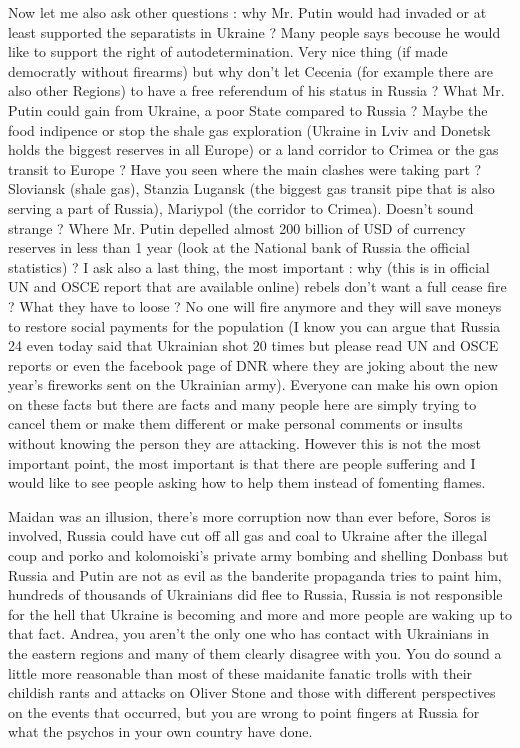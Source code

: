 \begin{itemize}
\begin{itemize}
Now let me also ask other questions : why Mr. Putin would had
invaded or at least supported the separatists in Ukraine ? Many people says
becouse he would like to support the right of autodetermination. Very nice
thing (if made democratly without firearms) but why don't let Cecenia (for
example there are also other Regions) to have a free referendum of his status
in Russia ? What Mr. Putin could gain from Ukraine, a poor State compared to
Russia ? Maybe the food indipence or stop the shale gas exploration (Ukraine in
Lviv and Donetsk holds the biggest reserves in all Europe) or a land corridor
to Crimea or the gas transit to Europe ? Have you seen where the main clashes
were taking part ? Sloviansk (shale gas), Stanzia Lugansk (the biggest gas
transit pipe that is also serving a part of Russia), Mariypol (the corridor to
Crimea). Doesn't sound strange ? Where Mr. Putin depelled almost 200 billion of
USD of currency reserves in less than 1 year (look at the National bank of
Russia the official statistics) ? I ask also a last thing, the most important :
why (this is in official UN and OSCE report that are available online) rebels
don't want a full cease fire ? What they have to loose ? No one will fire
anymore and they will save moneys to restore social payments for the population
(I know you can argue that Russia 24 even today said that Ukrainian shot 20
times but please read UN and OSCE reports or even the facebook page of DNR
where they are joking about the new year's fireworks sent on the Ukrainian
army). Everyone can make his own opion on these facts but there are facts and
many people here are simply trying to cancel them or make them different or
make personal comments or insults without knowing the person they are
attacking. However this is not the most important point, the most important is
that there are people suffering and I would like to see people asking how to
help them instead of fomenting flames.


Maidan was an illusion, there's more corruption now than ever before, Soros is
involved, Russia could have cut off all gas and coal to Ukraine after the
illegal coup and porko and kolomoiski's private army bombing and shelling
Donbass but Russia and Putin are not as evil as the banderite propaganda tries
to paint him, hundreds of thousands of Ukrainians did flee to Russia, Russia is
not responsible for the hell that Ukraine is becoming and more and more people
are waking up to that fact. Andrea, you aren't the only one who has contact
with Ukrainians in the eastern regions and many of them clearly disagree with
you. You do sound a little more reasonable than most of these maidanite fanatic
trolls with their childish rants and attacks on Oliver Stone and those with
different perspectives on the events that occurred, but you are wrong to point
fingers at Russia for what the psychos in your own country have done.


\end{itemize}
\end{itemize}
